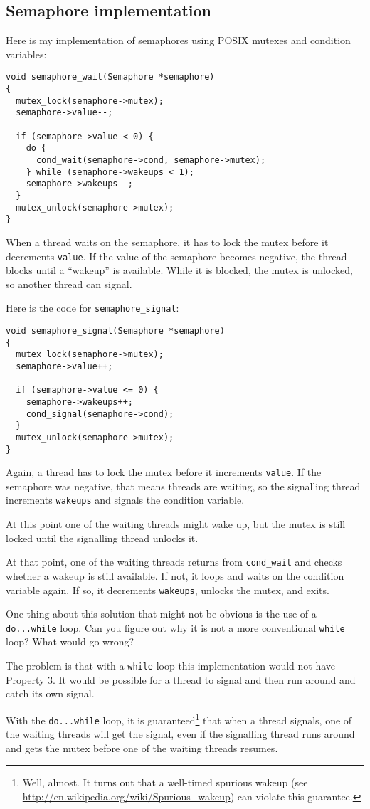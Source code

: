 \documentclass[12pt]{book}
\begin{document}
\subsection{Semaphore implementation}

Here is my implementation of semaphores using POSIX mutexes
and condition variables:

\begin{verbatim}
void semaphore_wait(Semaphore *semaphore)
{
  mutex_lock(semaphore->mutex);
  semaphore->value--;

  if (semaphore->value < 0) {
    do {
      cond_wait(semaphore->cond, semaphore->mutex);
    } while (semaphore->wakeups < 1);
    semaphore->wakeups--;
  }
  mutex_unlock(semaphore->mutex);
}
\end{verbatim}

When a thread waits on the semaphore, it has to lock the mutex
before it decrements {\tt value}.  If the value of the semaphore
becomes negative, the thread blocks until a ``wakeup'' is
available.  While it is blocked, the mutex is unlocked, so another
thread can signal.

Here is the code for \verb"semaphore_signal":

\begin{verbatim}
void semaphore_signal(Semaphore *semaphore)
{
  mutex_lock(semaphore->mutex);
  semaphore->value++;

  if (semaphore->value <= 0) {
    semaphore->wakeups++;
    cond_signal(semaphore->cond);
  }
  mutex_unlock(semaphore->mutex);
}
\end{verbatim}

Again, a thread has to lock the mutex before it increments
{\tt value}.  If the semaphore was negative, that means threads
are waiting, so the signalling thread increments {\tt wakeups} and
signals the condition variable.

At this point one of the waiting threads might wake up, but the
mutex is still locked until the signalling thread unlocks it.

At that point, one of the waiting threads returns from \verb"cond_wait"
and checks whether a wakeup is still available.  If not, it
loops and waits on the condition variable again.  If so, it
decrements {\tt wakeups}, unlocks the mutex, and exits.

One thing about this solution that might not be obvious is the use of
a {\tt do...while} loop.  Can you figure out why it is not a
more conventional {\tt while} loop?  What would go wrong?

The problem is that with a {\tt while} loop this implementation would
not have Property 3.  It would be possible for a thread to signal and
then run around and catch its own signal.

With the {\tt do...while} loop, it is guaranteed\footnote{Well,
  almost.  It turns out that a well-timed spurious wakeup (see
  \url{http://en.wikipedia.org/wiki/Spurious_wakeup}) can violate this
  guarantee.} that when a thread signals, one of the waiting threads
will get the signal, even if the signalling thread runs around and
gets the mutex before one of the waiting threads resumes.
\end{document}

